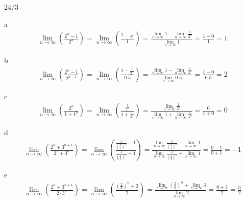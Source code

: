 \begin{exercise}{24/3}
  \item [a]
  \begin{gather*}
    \lim\limits_{n \to \infty} (\frac{2^n - 1}{2^n}) = \lim\limits_{n \to \infty} (\frac{1 - \frac{1}{2^n}}{1}) = \frac{\lim\limits_{n \to \infty} 1 - \lim\limits_{n \to \infty} \frac{1}{2^n}}{\lim\limits_{n \to \infty} 1} = \frac{1 - 0}{1} = 1
  \end{gather*}
  \item [b]
  \begin{gather*}
    \lim\limits_{n \to \infty} (\frac{2^n - 1}{2^{n - 1}}) = \lim\limits_{n \to \infty} (\frac{1 - \frac{1}{2^n}}{0.5}) = \frac{\lim\limits_{n \to \infty} 1 - \lim\limits_{n \to \infty} \frac{1}{2^n}}{\lim\limits_{n \to \infty} 0.5} = \frac{1 - 0}{0.5} = 2
  \end{gather*}
  \item [c]
  \begin{gather*}
    \lim\limits_{n \to \infty} (\frac{2^n}{1 + 4^n}) = \lim\limits_{n \to \infty} (\frac{\frac{1}{2^n}}{1 + \frac{1}{4^n}}) = \frac{\lim\limits_{n \to \infty} \frac{1}{2^n}}{\lim\limits_{n \to \infty} 1 + \lim\limits_{n \to \infty} \frac{1}{4^n}}= \frac{0}{1 + 0} = 0
  \end{gather*}
  \item [d]
  \begin{gather*}
    \lim\limits_{n \to \infty} (\frac{2^n + 3^{n+1}}{2^n + 3^n}) = \lim\limits_{n \to \infty} (\frac{\frac{1}{(\frac{3}{2})^n} - 1}{\frac{1}{(\frac{3}{2})^n} + 1}) = \frac{ \lim\limits_{n \to \infty}\frac{1}{(\frac{3}{2})^n} - \lim\limits_{n \to \infty} 1}{\lim\limits_{n \to \infty} \frac{1}{(\frac{3}{2})^n} + \lim\limits_{n \to \infty} 1} = \frac{0 - 1}{0 + 1} = -1
  \end{gather*}
  \item [e]
  \begin{gather*}
    \lim\limits_{n \to \infty} (\frac{2^n + 3^{n + 1}}{2 \cdot 3^n}) = \lim\limits_{n \to \infty} (\frac{(\frac{2}{3})^n + 3}{2}) = \frac{\lim\limits_{n \to \infty} (\frac{2}{3})^n + \lim\limits_{n \to \infty} 3}{\lim\limits_{n \to \infty} 2} = \frac{0 + 3}{2} = \frac{3}{2}
  \end{gather*}
\end{exercise}


